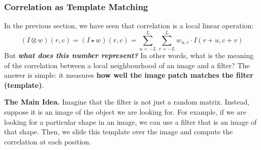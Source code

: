 \subsubsection{Correlation as Template Matching}\label{sec:correlation-as-template-matching}

In the previous section, we have seen that correlation is a local linear operation:
\begin{equation*}
    \left(I \otimes w\right)\left(r,c\right) = \left(I \star w\right)\left(r,c\right) = \sum_{u=-L}^{L} \sum_{v=-L}^{L} w_{u,v} \cdot I\left(r+u, c+v\right)
\end{equation*}
But \textbf{\emph{what does this number represent?}} In other words, what is the meaning of the correlation between a local neighbourhood of an image and a filter? The answer is simple: it measures \textbf{how well the image patch matches the filter (template)}.

\highspace
\textcolor{Green3}{ \textbf{The Main Idea.}} Imagine that the filter is not just a random matrix. Instead, suppose it is an image of the object we are looking for. For example, if we are looking for a particular shape in an image, we can use a filter that is an image of that shape. Then, we slide this template over the image and compute the correlation at each position.

